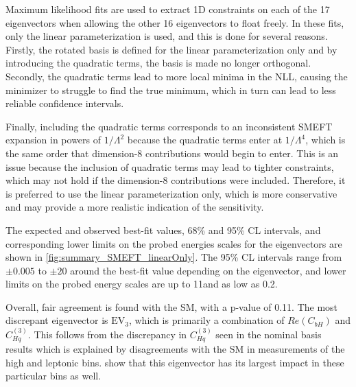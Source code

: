 Maximum likelihood fits are used to extract 1D constraints on each of the 17 eigenvectors when allowing the other 16 eigenvectors to float freely. In these fits, only the linear parameterization is used, and this is done for several reasons. Firstly, the rotated basis is defined for the linear parameterization only and by introducing the quadratic terms, the basis is made no longer orthogonal. Secondly, the quadratic terms lead to more local minima in the NLL, causing the minimizer to struggle to find the true minimum, which in turn can lead to less reliable confidence intervals. 

Finally, including the quadratic terms corresponds to an inconsistent SMEFT expansion in powers of $1/\Lambda^2$ because the quadratic terms enter at $1/\Lambda^4$, which is the same order that dimension-8 contributions would begin to enter. This is an issue because the inclusion of quadratic terms may lead to tighter constraints, which may not hold if the dimension-8 contributions were included. Therefore, it is preferred to use the linear parameterization only, which is more conservative and may provide a more realistic indication of the sensitivity.

The expected and observed best-fit values, 68\% and 95\% CL intervals, and corresponding lower limits on the probed energies scales for the eigenvectors are shown in \cref{fig:summary_SMEFT_linearOnly}. The 95\% CL intervals range from $\pm 0.005$ to $\pm 20$ around the best-fit value depending on the eigenvector, and lower limits on the probed energy scales are up to 11\TeV and as low as 0.2\TeV.

Overall, fair agreement is found with the SM, with a p-value of 0.11. The most discrepant eigenvector is $\mathrm{EV}_3$, which is primarily a combination of $Re(C_{bH})$ and $C_{Hq}^{(3)}$. This follows from the discrepancy in $C_{Hq}^{(3)}$ seen in the nominal basis results which is explained by disagreements with the SM in measurements of the high \ptV \WH and \ZH leptonic bins.  show that this eigenvector has its largest impact in these particular bins as well. 
